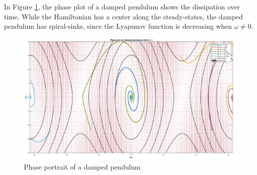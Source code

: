 \documentclass[12pt,1in]{article}
\begin{document}
In Figure \ref{fig:damped_pendulum}, the phase plot of a damped pendulum shows the dissipation over time. While the Hamiltonian has a center along the steady-states, the damped pendulum has spiral-sinks, since the Lyapunov function is decreasing when $\omega \neq 0$.  
\begin{figure}[H]
	\centering
	\includegraphics[trim={2in 0 1.5in 0}, width=\linewidth]{Figures/pendulum_phase_damped}
	\caption{Phase portrait of a damped pendulum}
	\label{fig:damped_pendulum}
\end{figure}
\end{document}
